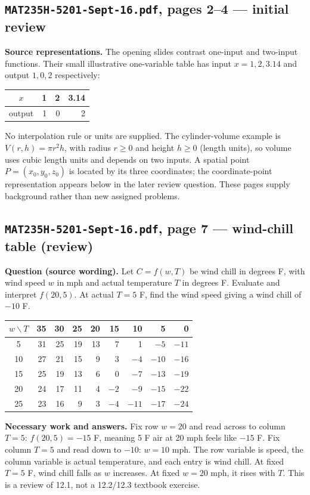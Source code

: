 \subsection{\texttt{MAT235H-5201-Sept-16.pdf}, pages 2--4 --- initial review}
\textbf{Source representations.} The opening slides contrast one-input and two-input functions. Their small illustrative one-variable table has input $x=1,2,3.14$ and output $1,0,2$ respectively:
\begin{center}\begin{tabular}{c|rrr}\toprule $x$&1&2&3.14\\\midrule output&1&0&2\\\bottomrule\end{tabular}\end{center}
No interpolation rule or units are supplied. The cylinder-volume example is $V(r,h)=\pi r^2h$, with radius $r\geq0$ and height $h\geq0$ (length units), so volume uses cubic length units and depends on two inputs. A spatial point $P=(x_0,y_0,z_0)$ is located by its three coordinates; the coordinate-point representation appears below in the later review question. These pages supply background rather than new assigned problems.

\subsection{\texttt{MAT235H-5201-Sept-16.pdf}, page 7 --- wind-chill table (review)}
\textbf{Question (source wording).} Let $C=f(w,T)$ be wind chill in degrees F, with wind speed $w$ in mph and actual temperature $T$ in degrees F. Evaluate and interpret $f(20,5)$. At actual $T=5$ F, find the wind speed giving a wind chill of $-10$ F.\par
\begin{center}\small\begin{tabular}{c|rrrrrrrr}\toprule $w\backslash T$ &35&30&25&20&15&10&5&0\\\midrule5&31&25&19&13&7&1&$-5$&$-11$\\10&27&21&15&9&3&$-4$&$-10$&$-16$\\15&25&19&13&6&0&$-7$&$-13$&$-19$\\20&24&17&11&4&$-2$&$-9$&$-15$&$-22$\\25&23&16&9&3&$-4$&$-11$&$-17$&$-24$\\\bottomrule\end{tabular}\end{center}
\textbf{Necessary work and answers.} Fix row $w=20$ and read across to column $T=5$: $f(20,5)=-15$ F, meaning 5 F air at 20 mph feels like $-15$ F. Fix column $T=5$ and read down to $-10$: $w=10$ mph. The row variable is speed, the column variable is actual temperature, and each entry is wind chill. At fixed $T=5$ F, wind chill falls as $w$ increases. At fixed $w=20$ mph, it rises with $T$. This is a review of 12.1, not a 12.2/12.3 textbook exercise.

